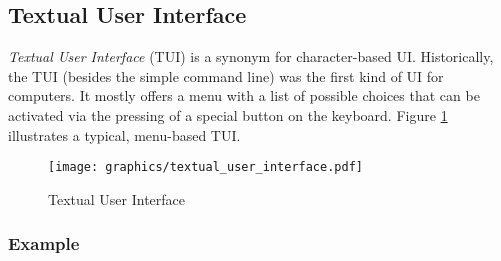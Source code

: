 %
%
%
%
%
%

\subsection{Textual User Interface}
\label{textual_user_interface_heading}

\emph{Textual User Interface} (TUI) is a synonym for character-based UI.
Historically, the TUI (besides the simple command line) was the first kind of
UI for computers. It mostly offers a menu with a list of possible choices that
can be activated via the pressing of a special button on the keyboard. Figure
\ref{textual_user_interface_figure} illustrates a typical, menu-based TUI.

\begin{figure}[ht]
    \begin{center}
        \texttt{[image: graphics/textual\_user\_interface.pdf]}
        \caption{Textual User Interface}
        \label{textual_user_interface_figure}
    \end{center}
\end{figure}

\subsubsection{Example}

